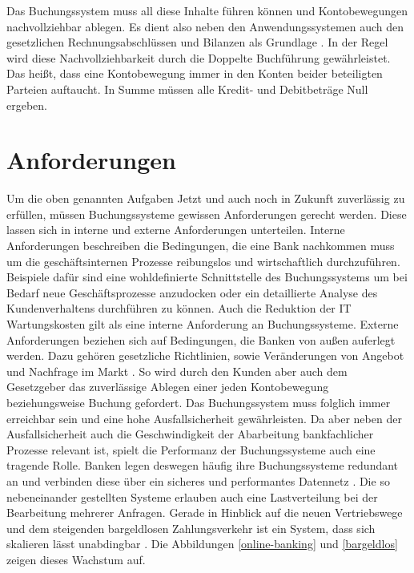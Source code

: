 \documentclass[12pt,oneside,a4paper,parskip]{scrbook}
\begin{document}
Das Buchungssystem muss all diese Inhalte führen können und Kontobewegungen nachvollziehbar ablegen. Es dient also neben den Anwendungssystemen auch den gesetzlichen Rechnungsabschlüssen und Bilanzen als Grundlage \cite{bankEnzy}\cite{MarkstudieKernbankensysteme}. In der Regel wird diese Nachvollziehbarkeit durch die Doppelte Buchführung gewährleistet. Das heißt, dass eine Kontobewegung immer in den Konten beider beteiligten Parteien auftaucht. In Summe müssen alle Kredit- und Debitbeträge Null ergeben\cite{accounting}.

\section{Anforderungen}
\label{anforderungen}
Um die oben genannten Aufgaben Jetzt und auch noch in Zukunft zuverlässig zu erfüllen, müssen Buchungssysteme gewissen Anforderungen gerecht werden. Diese lassen sich in interne und externe Anforderungen unterteilen. Interne Anforderungen beschreiben die Bedingungen, die eine Bank nachkommen muss um die geschäftsinternen Prozesse reibungslos und wirtschaftlich durchzuführen. Beispiele dafür sind eine wohldefinierte Schnittstelle des Buchungssystems um bei Bedarf neue Geschäftsprozesse anzudocken oder ein detaillierte Analyse des Kundenverhaltens durchführen zu können. Auch die Reduktion der IT Wartungskosten gilt als eine interne Anforderung an Buchungssysteme. Externe Anforderungen beziehen sich auf Bedingungen, die Banken von außen auferlegt werden. Dazu gehören gesetzliche Richtlinien, sowie Veränderungen von Angebot und Nachfrage im Markt \cite{capgemini}. So wird durch den Kunden aber auch dem Gesetzgeber das zuverlässige Ablegen einer jeden Kontobewegung beziehungsweise Buchung gefordert. Das Buchungssystem muss folglich immer erreichbar sein und eine hohe Ausfallsicherheit gewährleisten. Da aber neben der Ausfallsicherheit auch die Geschwindigkeit der Abarbeitung bankfachlicher Prozesse relevant ist, spielt die Performanz der Buchungssysteme auch eine tragende Rolle. Banken legen deswegen häufig ihre Buchungssysteme redundant an und verbinden diese über ein sicheres und performantes Datennetz \cite{bankEnzy}\cite[97-99]{ITidF}. Die so nebeneinander gestellten Systeme erlauben auch eine Lastverteilung bei der Bearbeitung mehrerer Anfragen. Gerade in Hinblick auf die neuen Vertriebswege und dem steigenden bargeldlosen Zahlungsverkehr ist ein System, dass sich skalieren lässt unabdingbar \cite{bankEnzy}\cite{capgemini}. Die Abbildungen \ref{online-banking} und \ref{bargeldlos} zeigen dieses Wachstum auf.
\end{document}
